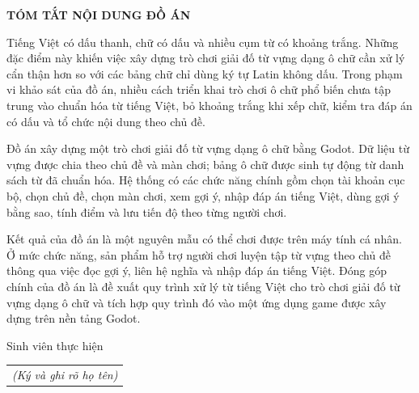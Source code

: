 \documentclass[../DoAn.tex]{subfiles}
\begin{document}
\begin{center}
    \Large{\textbf{TÓM TẮT NỘI DUNG ĐỒ ÁN}}\\
\end{center}
\vspace{1cm}

Tiếng Việt có dấu thanh, chữ có dấu và nhiều cụm từ có khoảng trắng. Những đặc điểm này khiến việc xây dựng trò chơi giải đố từ vựng dạng ô chữ cần xử lý cẩn thận hơn so với các bảng chữ chỉ dùng ký tự Latin không dấu. Trong phạm vi khảo sát của đồ án, nhiều cách triển khai trò chơi ô chữ phổ biến chưa tập trung vào chuẩn hóa từ tiếng Việt, bỏ khoảng trắng khi xếp chữ, kiểm tra đáp án có dấu và tổ chức nội dung theo chủ đề.

Đồ án xây dựng một trò chơi giải đố từ vựng dạng ô chữ bằng Godot. Dữ liệu từ vựng được chia theo chủ đề và màn chơi; bảng ô chữ được sinh tự động từ danh sách từ đã chuẩn hóa. Hệ thống có các chức năng chính gồm chọn tài khoản cục bộ, chọn chủ đề, chọn màn chơi, xem gợi ý, nhập đáp án tiếng Việt, dùng gợi ý bằng sao, tính điểm và lưu tiến độ theo từng người chơi.

Kết quả của đồ án là một nguyên mẫu có thể chơi được trên máy tính cá nhân. Ở mức chức năng, sản phẩm hỗ trợ người chơi luyện tập từ vựng theo chủ đề thông qua việc đọc gợi ý, liên hệ nghĩa và nhập đáp án tiếng Việt. Đóng góp chính của đồ án là đề xuất quy trình xử lý từ tiếng Việt cho trò chơi giải đố từ vựng dạng ô chữ và tích hợp quy trình đó vào một ứng dụng game được xây dựng trên nền tảng Godot.

\begin{flushright}
Sinh viên thực hiện\\
\begin{tabular}{@{}c@{}}
\textit{(Ký và ghi rõ họ tên)}
\end{tabular}
\end{flushright}
\end{document}

